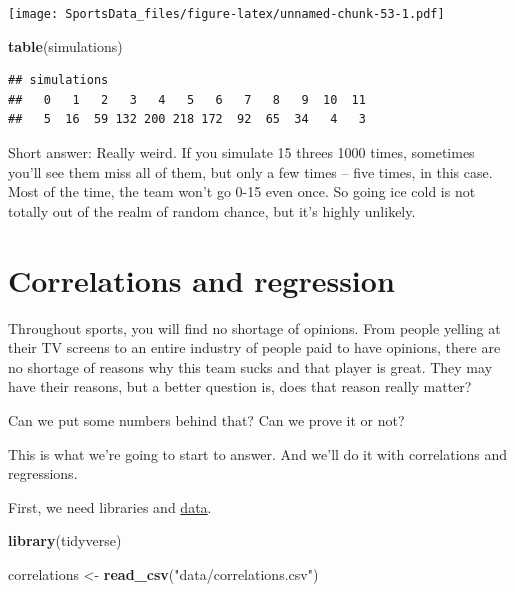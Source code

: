 \documentclass[]{book}
\newenvironment{Shaded}{\begin{snugshade}}{\end{snugshade}}
\newcommand{\KeywordTok}[1]{\textcolor[rgb]{0.13,0.29,0.53}{\textbf{#1}}}
\newcommand{\NormalTok}[1]{#1}
\newcommand{\StringTok}[1]{\textcolor[rgb]{0.31,0.60,0.02}{#1}}
\begin{document}
\texttt{[image: SportsData\_files/figure-latex/unnamed-chunk-53-1.pdf]}

\begin{Shaded}
\begin{Highlighting}[]
\KeywordTok{table}\NormalTok{(simulations)}
\end{Highlighting}
\end{Shaded}

\begin{verbatim}
## simulations
##   0   1   2   3   4   5   6   7   8   9  10  11 
##   5  16  59 132 200 218 172  92  65  34   4   3
\end{verbatim}

Short answer: Really weird. If you simulate 15 threes 1000 times, sometimes you'll see them miss all of them, but only a few times -- five times, in this case. Most of the time, the team won't go 0-15 even once. So going ice cold is not totally out of the realm of random chance, but it's highly unlikely.

\hypertarget{correlations-and-regression}{%
\chapter{Correlations and regression}\label{correlations-and-regression}}

Throughout sports, you will find no shortage of opinions. From people yelling at their TV screens to an entire industry of people paid to have opinions, there are no shortage of reasons why this team sucks and that player is great. They may have their reasons, but a better question is, does that reason really matter?

Can we put some numbers behind that? Can we prove it or not?

This is what we're going to start to answer. And we'll do it with correlations and regressions.

First, we need libraries and \href{https://unl.box.com/s/zlxoptqixkt98gubk3i6316qun99l49r}{data}.

\begin{Shaded}
\begin{Highlighting}[]
\KeywordTok{library}\NormalTok{(tidyverse)}
\end{Highlighting}
\end{Shaded}

\begin{Shaded}
\begin{Highlighting}[]
\NormalTok{correlations <-}\StringTok{ }\KeywordTok{read_csv}\NormalTok{(}\StringTok{"data/correlations.csv"}\NormalTok{)}
\end{Highlighting}
\end{Shaded}
\end{document}
